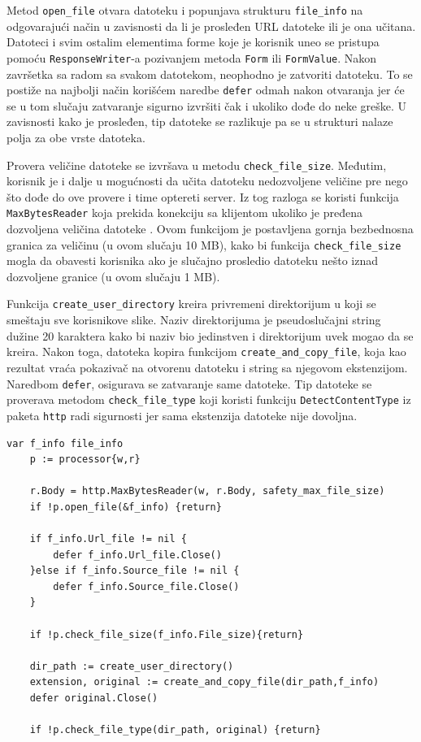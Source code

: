 \documentclass[12pt,oneside]{memoir}
\begin{document}
Metod \texttt{open\_file} otvara datoteku i popunjava strukturu \texttt{file\_info} na odgovarajući način u zavisnosti da li je prosleđen URL datoteke ili je ona učitana. Datoteci i svim ostalim elementima forme koje je korisnik uneo se pristupa pomoću \texttt{ResponseWriter}-a pozivanjem metoda \texttt{Form} ili \texttt{FormValue}. Nakon završetka sa radom sa svakom datotekom, neophodno je zatvoriti datoteku. To se postiže na najbolji način korišćem naredbe \texttt{defer} odmah nakon otvaranja jer će se u tom slučaju zatvaranje sigurno izvršiti čak i ukoliko dođe do neke greške. U zavisnosti kako je prosleđen, tip datoteke se razlikuje pa se u strukturi nalaze polja za obe vrste datoteka. 

Provera veličine datoteke se izvršava u metodu \texttt{check\_file\_size}. Međutim, korisnik je i dalje u mogućnosti da učita datoteku nedozvoljene veličine pre nego što dođe do ove provere i time optereti server. Iz tog razloga se koristi funkcija \texttt{MaxBytesReader} koja prekida konekciju sa klijentom ukoliko je pređena dozvoljena veličina datoteke \cite{http}. Ovom funkcijom je postavljena gornja bezbednosna granica za veličinu (u ovom slučaju 10 MB), kako bi funkcija \texttt{check\_file\_size} mogla da obavesti korisnika ako je slučajno prosledio datoteku nešto iznad dozvoljene granice (u ovom slučaju 1 MB). 

Funkcija \texttt{create\_user\_directory} kreira privremeni direktorijum u koji se smeštaju sve korisnikove slike. Naziv direktorijuma je pseudoslučajni string dužine 20 karaktera kako bi naziv bio jedinstven i direktorijum uvek mogao da se kreira. Nakon toga, datoteka kopira funkcijom \texttt{create\_and\_copy\_file}, koja kao rezultat vraća pokazivač na otvorenu datoteku i string sa njegovom ekstenzijom. Naredbom \texttt{defer}, osigurava se zatvaranje same datoteke. Tip datoteke se proverava metodom  \texttt{check\_file\_type} koji koristi funkciju \texttt{DetectContentType} iz paketa \texttt{http} radi sigurnosti jer sama ekstenzija datoteke nije dovoljna.

\begin{center}
\begin{lstlisting}[caption=Otvaranje i provera datoteke u funkciji ImageHandler,label={lst:open},  backgroundcolor=\color{background}]
	var f_info file_info
	p := processor{w,r}

	r.Body = http.MaxBytesReader(w, r.Body, safety_max_file_size)
	if !p.open_file(&f_info) {return}

	if f_info.Url_file != nil {
		defer f_info.Url_file.Close()
	}else if f_info.Source_file != nil {
		defer f_info.Source_file.Close()
	}

	if !p.check_file_size(f_info.File_size){return}

	dir_path := create_user_directory()
	extension, original := create_and_copy_file(dir_path,f_info)
	defer original.Close()

	if !p.check_file_type(dir_path, original) {return}
\end{lstlisting}
\end{center}
 
\end{document}
